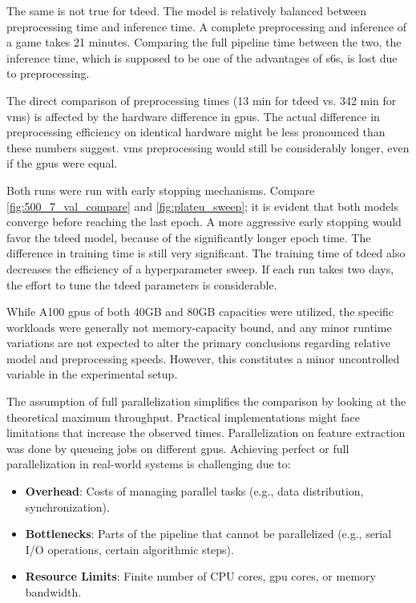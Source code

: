 The same is not true for \acrshort{tdeed}. The model is relatively balanced between preprocessing time and inference time. A complete preprocessing and inference of a game takes 21 minutes. Comparing the full pipeline time between the two, the inference time, which is supposed to be one of the advantages of \acrlong{s6}s, is lost due to preprocessing. 

The direct comparison of preprocessing times (13 min for \acrshort{tdeed} vs. 342 min for \acrshort{vms}) is affected by the hardware difference in \acrshort{gpu}s. The actual difference in preprocessing efficiency on identical hardware might be less pronounced than these numbers suggest. \acrshort{vms} preprocessing would still be considerably longer, even if the \acrshort{gpu}s were equal. 


Both runs were run with early stopping mechanisms. Compare \cref{fig:500_7_val_compare} and \cref{fig:plateu_sweep}; it is evident that both models converge before reaching the last epoch. A more aggressive early stopping would favor the \acrshort{tdeed} model, because of the significantly longer epoch time. The difference in training time is still very significant. The training time of \acrshort{tdeed} also decreases the efficiency of a hyperparameter sweep. If each run takes two days, the effort to tune the \acrshort{tdeed} parameters is considerable. 

While A100 \acrshort{gpu}s of both 40GB and 80GB capacities were utilized, the specific workloads were generally not memory-capacity bound, and any minor runtime variations are not expected to alter the primary conclusions regarding relative model and preprocessing speeds. However, this constitutes a minor uncontrolled variable in the experimental setup. 

The assumption of full parallelization simplifies the comparison by looking at the theoretical maximum throughput. Practical implementations might face limitations that increase the observed times. Parallelization on feature extraction was done by queueing jobs on different \acrshort{gpu}s. Achieving perfect or full parallelization in real-world systems is challenging due to:
\begin{itemize}
    \item \textbf{Overhead}: Costs of managing parallel tasks (e.g., data distribution, synchronization).
    \item \textbf{Bottlenecks}: Parts of the pipeline that cannot be parallelized (e.g., serial I/O operations, certain algorithmic steps).
    \item \textbf{Resource Limits}: Finite number of CPU cores, \acrshort{gpu} cores, or memory bandwidth.
\end{itemize}

